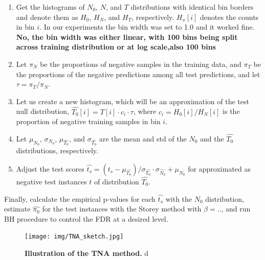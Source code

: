 \documentclass{article}
\begin{document}
\begin{enumerate}%
	\itemsep-3pt  		
	\item Get the histograms of $N_0$, $N$, and $T$ distributions with identical bin borders and denote them as $H_0$, $H_N$, and $H_T$, respectively. $H_x[i]$ denotes the counts in bin $i$.  In our experiments the bin width was set to 1.0 and it worked fine. \textbf{No, the bin width was either linear, with 100 bins being split across training distribution or at log scale,also 100 bins}
	
	\item Let $\pi_N$ be the proportions of negative samples in the training data, and $\pi_T$ be the proportions of the negative predictions among all test predictions, and let $\tau=\pi_T/\pi_N$. 
	
	\item Let us create a new histogram, which will be an approximation of the test null distribution, $\hat{T_0}[i]=T[i]\cdot c_i\cdot \tau$, where $c_i=H_0[i]/H_N[i]$ is the proportion of negative training samples in bin $i$.
	
	\item Let $\mu_{N_0}$, $\sigma_{N_0}$, $\mu_{\hat{T_0}}$, and $\sigma_{\hat{T_0}}$ are the mean and std of the $N_0$ and the $\hat{T_0}$ distributions, respectively. 
	
	\item Adjust the test scores $\hat{t_s} = (t_s-\mu_{\hat{T_0}})/\sigma_{\hat{T_0}} \cdot \sigma_{\hat{N_0}} + \mu_{N_0}$ for approximated as negative test instances $t$ of distribution $\hat{T_0}$.
\end{enumerate}

	Finally, calculate the empirical p-values for each $\hat{t_s}$ with the $N_0$ distribution, estimate  $\hat{\pi_0}$ for the test instances with the Storey method with $\beta= ..$, and run BH procedure to control the FDR at a desired level. 
	
\begin{figure}[h!]
	\centering
	\texttt{[image: img/TNA\_sketch.jpg]}
	\caption{{\bf Illustration of the TNA method.} d}
	\label{fig:tna-skecth}
\end{figure}  
	
	
%	
%	
	
\end{document}
